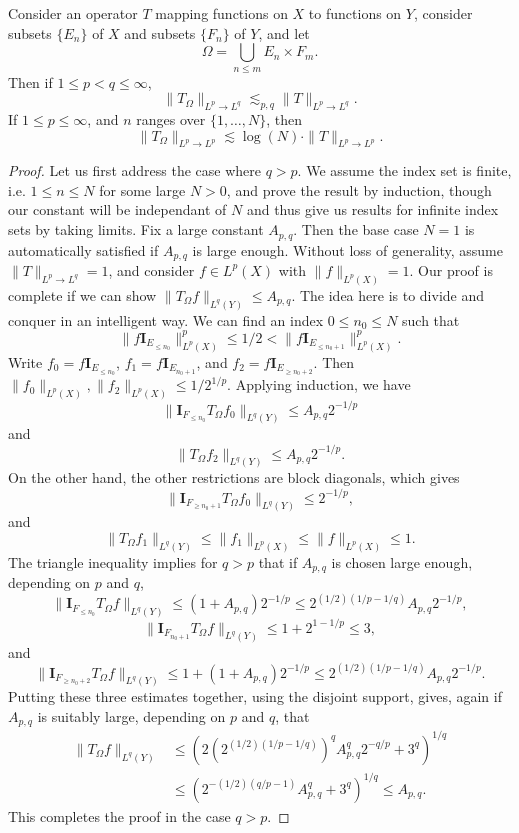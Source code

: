 \begin{theorem}
    Consider an operator $T$ mapping functions on $X$ to functions on $Y$, consider subsets $\{ E_n \}$ of $X$ and subsets $\{ F_n \}$ of $Y$, and let
    \[ \Omega = \bigcup_{n \leq m} E_n \times F_m. \]
    Then if $1 \leq p < q \leq \infty$,
    \[ \| T_\Omega \|_{L^p \to L^q} \lesssim_{p,q} \| T \|_{L^p \to L^q}. \]
    If $1 \leq p \leq \infty$, and $n$ ranges over $\{ 1, \dots, N \}$, then
    \[ \| T_\Omega \|_{L^p \to L^p} \lesssim \log(N) \cdot \| T \|_{L^p \to L^p}. \]
\end{theorem}
\begin{proof}
    Let us first address the case where $q > p$. We assume the index set is finite, i.e. $1 \leq n \leq N$ for some large $N > 0$, and prove the result by induction, though our constant will be independant of $N$ and thus give us results for infinite index sets by taking limits. Fix a large constant $A_{p,q}$. Then the base case $N = 1$ is automatically satisfied if $A_{p,q}$ is large enough. Without loss of generality, assume $\| T \|_{L^p \to L^q} = 1$, and consider $f \in L^p(X)$ with $\| f \|_{L^p(X)} = 1$. Our proof is complete if we can show $\| T_\Omega f \|_{L^q(Y)} \leq A_{p,q}$. The idea here is to divide and conquer in an intelligent way. We can find an index $0 \leq n_0 \leq N$ such that
    \[ \| f \mathbf{I}_{E_{\leq n_0}} \|_{L^p(X)}^p \leq 1/2 < \| f \mathbf{I}_{E_{\leq n_0 + 1}} \|_{L^p(X)}^p. \]
    Write $f_0 = f \mathbf{I}_{E_{\leq n_0}}$, $f_1 = f \mathbf{I}_{E_{n_0 + 1}}$, and $f_2 = f \mathbf{I}_{E_{\geq n_0 + 2}}$. Then $\| f_0 \|_{L^p(X)}, \| f_2 \|_{L^p(X)} \leq 1/2^{1/p}$. Applying induction, we have
    \[ \| \mathbf{I}_{F_{\leq n_0}} T_\Omega f_0 \|_{L^q(Y)} \leq A_{p,q} 2^{-1/p} \]
    and
    \[ \| T_\Omega f_2 \|_{L^q(Y)} \leq A_{p,q} 2^{-1/p}. \]
    On the other hand, the other restrictions are block diagonals, which gives
    \[ \| \mathbf{I}_{F_{\geq n_0 + 1}} T_\Omega f_0 \|_{L^q(Y)} \leq 2^{-1/p}, \]
    and
    \[ \| T_\Omega f_1 \|_{L^q(Y)} \leq \| f_1 \|_{L^p(X)} \leq \| f \|_{L^p(X)} \leq 1. \]
    The triangle inequality implies for $q > p$ that if $A_{p,q}$ is chosen large enough, depending on $p$ and $q$,
    \[ \| \mathbf{I}_{F_{\leq n_0}} T_\Omega f \|_{L^q(Y)} \leq (1 + A_{p,q}) 2^{-1/p} \leq 2^{(1/2)(1/p - 1/q)} A_{p,q} 2^{-1/p}, \]
    \[ \| \mathbf{I}_{F_{n_0 + 1}} T_\Omega f \|_{L^q(Y)} \leq 1 + 2^{1-1/p} \leq 3, \]
    and
    \[ \| \mathbf{I}_{F_{\geq n_0 + 2}} T_\Omega f \|_{L^q(Y)} \leq 1 + (1 + A_{p,q}) 2^{-1/p} \leq 2^{(1/2)(1/p - 1/q)} A_{p,q} 2^{-1/p}. \]
    Putting these three estimates together, using the disjoint support, gives, again if $A_{p,q}$ is suitably large, depending on $p$ and $q$, that
    \begin{align*}
        \| T_\Omega f \|_{L^q(Y)} &\leq ( 2 (2^{(1/2)(1/p - 1/q)})^q A_{p,q}^q 2^{-q/p} + 3^q )^{1/q}\\
        &\leq ( 2^{-(1/2)(q/p - 1)} A_{p,q}^q + 3^q )^{1/q} \leq A_{p,q}.
    \end{align*}
    This completes the proof in the case $q > p$.


\end{proof}
